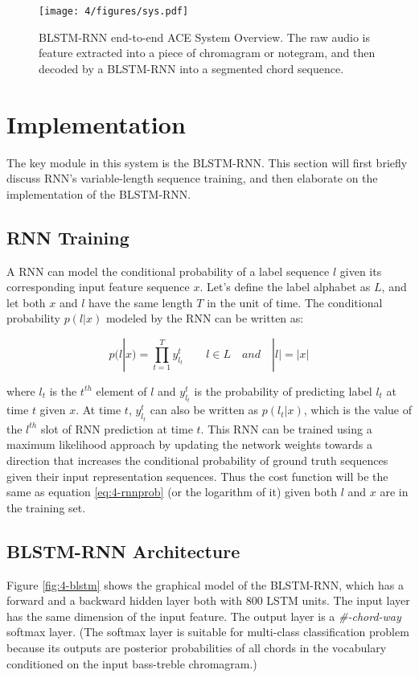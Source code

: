\begin{figure}[htb]
\centering
\texttt{[image: 4/figures/sys.pdf]}
\caption{BLSTM-RNN end-to-end ACE System Overview. The raw audio is feature extracted into a piece of chromagram or notegram, and then decoded by a BLSTM-RNN into a segmented chord sequence.}
\label{fig:4-sysover}
\end{figure}

\section{Implementation}\label{sec:4-blstm}
The key module in this system is the BLSTM-RNN. This section will first briefly discuss RNN's variable-length sequence training, and then elaborate on the implementation of the BLSTM-RNN.

\subsection{RNN Training}
A RNN can model the conditional probability of a label sequence $l$ given its corresponding input feature sequence $x$. Let's define the label alphabet as $L$, and let both $x$ and $l$ have the same length $T$ in the unit of time. The conditional probability $p(l|x)$ modeled by the RNN can be written as:

\begin{equation}\label{eq:4-rnnprob}
	p(l|x) = \prod_{t=1}^T y_{l_t}^t  \quad\quad l\in L \quad and \quad |l| = |x|
\end{equation}

where $l_t$ is the $t^{th}$ element of $l$ and $y_{l_t}^t$ is the probability of predicting label $l_t$ at time $t$ given $x$. At time $t$, $y_{l_t}^t$ can also be written as $p(l_t|x)$, which is the value of the $l^{th}$ slot of RNN prediction at time $t$. This RNN can be trained using a maximum likelihood approach by updating the network weights towards a direction that increases the conditional probability of ground truth sequences given their input representation sequences. Thus the cost function will be the same as equation \ref{eq:4-rnnprob} (or the logarithm of it) given both $l$ and $x$ are in the training set.

\subsection{BLSTM-RNN Architecture} \label{sec:blstmrnnarch}
Figure \ref{fig:4-blstm} shows the graphical model of the BLSTM-RNN, which has a forward and a backward hidden layer both with 800 LSTM units. The input layer has the same dimension of the input feature. The output layer is a \textit{\#-chord-way} softmax layer. (The softmax layer is suitable for multi-class classification problem because its outputs are posterior probabilities of all chords in the vocabulary conditioned on the input bass-treble chromagram.)

